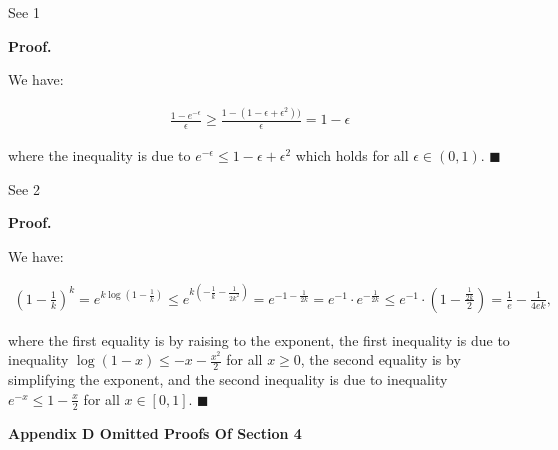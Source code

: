 See 1\par




\par\medskip\noindent\textbf{Proof.}\par



We have:\par


\[\begin{gathered}
\displaystyle\frac{1-e^{-\epsilon}}{\epsilon}\geq\frac{1-(1-\epsilon+\epsilon^{2}))}{\epsilon}=1-\epsilon
\end{gathered}\]


where the inequality is due to $e^{-\epsilon}\leq 1-\epsilon+\epsilon^{2}$ which holds for all $\epsilon\in(0,1)$.
\ensuremath{\blacksquare}\par





See 2\par




\par\medskip\noindent\textbf{Proof.}\par



We have:\par


\[\begin{gathered}
\displaystyle\left(1-\frac{1}{k}\right)^{k}=e^{k\log\left(1-\frac{1}{k}\right)}\leq e^{k\left(-\frac{1}{k}-\frac{1}{2k^{2}}\right)}=e^{-1-\frac{1}{2k}}=e^{-1}\cdot e^{-\frac{1}{2k}}\leq e^{-1}\cdot\left(1-\frac{\frac{1}{2k}}{2}\right)=\frac{1}{e}-\frac{1}{4ek},
\end{gathered}\]


where the first equality is by raising to the exponent, the first inequality is due to inequality $\log\left(1-x\right)\leq-x-\frac{x^{2}}{2}$ for all $x\geq 0$, the second equality is by simplifying the exponent, and the second inequality is due to inequality $e^{-x}\leq 1-\frac{x}{2}$ for all $x\in[0,1]$.
\ensuremath{\blacksquare}\par







\par\medskip\noindent\textbf{Appendix D Omitted Proofs Of Section 4}\par



